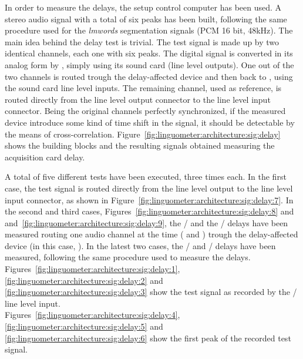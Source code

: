 In order to measure the delays, the setup control computer  has been 
used.
A stereo audio signal with a total of six peaks has been built, 
following the same procedure used for the \emph{lmwords} segmentation signals
(PCM 16 bit, 48kHz).
The main idea behind the delay test is trivial. The test signal is made up by
two identical channels, each one with six peaks.
The digital signal is converted in its analog form by , simply using
its sound card (line level outputs).
One out of the two channels is routed trough the delay-affected device and then
back to , using the sound card line level inputs.
The remaining channel, used as reference, is routed directly
from the line level output connector to the line level input connector.
Being the original channels perfectly synchronized, if the measured device
introduce some kind of time shift in the signal, it should be detectable by the
means of cross-correlation.
Figure~\ref{fig:linguometer:architecture:sig:delay} shows the building blocks
and the resulting signals obtained measuring the acquisition card delay.

A total of five different tests have been executed, three times each.
In the first case, the test signal is routed directly from the line level output
to the line level input connector, as shown in
Figure~\ref{fig:linguometer:architecture:sig:delay:7}.
In the second and third cases,
Figures~\ref{fig:linguometer:architecture:sig:delay:8} and
and~\ref{fig:linguometer:architecture:sig:delay:9},
the  / and
the / delays have been measured routing one audio channel
at the time ( and ) trough the delay-affected
device (in this case, ).
In the latest two cases, the  / and 
/ delays have been measured, following the same
procedure used to measure the  delays.
Figures~\ref{fig:linguometer:architecture:sig:delay:1}, 
\ref{fig:linguometer:architecture:sig:delay:2} and
\ref{fig:linguometer:architecture:sig:delay:3} show the test signal 
as recorded by the  / line level input.\\
Figures~\ref{fig:linguometer:architecture:sig:delay:4}, 
\ref{fig:linguometer:architecture:sig:delay:5} and
\ref{fig:linguometer:architecture:sig:delay:6} show the
first peak of the recorded test signal.


